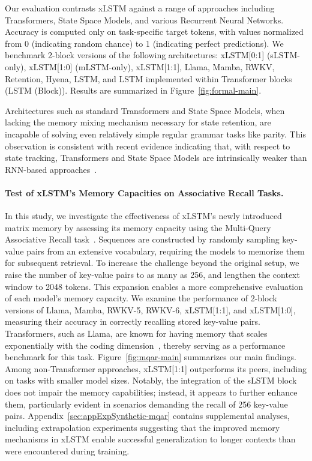 Our evaluation contrasts xLSTM against a range of approaches including Transformers, State Space Models, and various Recurrent Neural Networks. Accuracy is computed only on task-specific target tokens, with values normalized from 0 (indicating random chance) to 1 (indicating perfect predictions). We benchmark 2-block versions of the following architectures: xLSTM[0:1] (sLSTM-only), xLSTM[1:0] (mLSTM-only), xLSTM[1:1], Llama, Mamba, RWKV, Retention, Hyena, LSTM, and LSTM implemented within Transformer blocks (LSTM (Block)). Results are summarized in Figure~\ref{fig:formal-main}.

Architectures such as standard Transformers and State Space Models, when lacking the memory mixing mechanism necessary for state retention, are incapable of solving even relatively simple regular grammar tasks like parity. This observation is consistent with recent evidence indicating that, with respect to state tracking, Transformers and State Space Models are intrinsically weaker than RNN-based approaches~\citep{Merrill:24, Merrill:23, Deletang:23}.

\paragraph{Test of xLSTM's Memory Capacities on Associative Recall Tasks.} In this study, we investigate the effectiveness of xLSTM's newly introduced matrix memory by assessing its memory capacity using the Multi-Query Associative Recall task~\citep{Arora:23arxiv}. Sequences are constructed by randomly sampling key-value pairs from an extensive vocabulary, requiring the models to memorize them for subsequent retrieval. To increase the challenge beyond the original setup, we raise the number of key-value pairs to as many as 256, and lengthen the context window to 2048 tokens. This expansion enables a more comprehensive evaluation of each model's memory capacity. We examine the performance of 2-block versions of Llama, Mamba, RWKV-5, RWKV-6, xLSTM[1:1], and xLSTM[1:0], measuring their accuracy in correctly recalling stored key-value pairs. Transformers, such as Llama, are known for having memory that scales exponentially with the coding dimension~\citep{Ramsauer:21}, thereby serving as a performance benchmark for this task. Figure~\ref{fig:mqar-main} summarizes our main findings.
Among non-Transformer approaches, xLSTM[1:1] outperforms its peers, including on tasks with smaller model sizes. Notably, the integration of the sLSTM block does not impair the memory capabilities; instead, it appears to further enhance them, particularly evident in scenarios demanding the recall of 256 key-value pairs. Appendix~\ref{sec:appExpSynthetic-mqar} contains supplemental analyses, including extrapolation experiments suggesting that the improved memory mechanisms in xLSTM enable successful generalization to longer contexts than were encountered during training.

